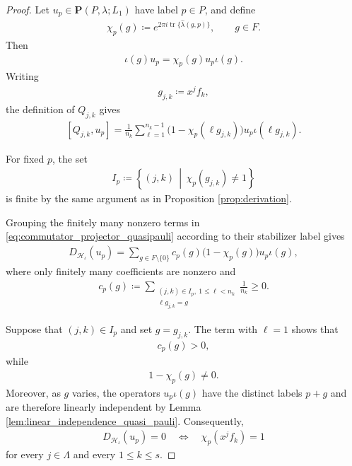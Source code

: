 \documentclass[sn-mathphys-num]{sn-jnl}
\theoremstyle{definition}
\numberwithin{equation}{section}
\theoremstyle{definition}
\def\CH {{\mathcal H}}
\def\La{{\Lambda}}
\def\l{{\lambda}}
\def\hl{{\hat \lambda}}
\def\tr{\operatorname{tr}}
\begin{document}
\begin{proof}
Let $u_p\in\textbf{P}(P,\l;L_1)$ have label $p\in P$, and define
\begin{align}
    \chi_p(g)
    \coloneqq
    e^{2\pi i\tr\{\hl(g,p)\}},
    \qquad g\in F.
\end{align}
Then
\begin{align}
    \iota(g)u_p=\chi_p(g)u_p\iota(g).
\end{align}
Writing
\begin{align}
    g_{j,k}\coloneqq x^jf_k,
\end{align}
the definition of $Q_{j,k}$ gives
\begin{align}\label{eq:commutator_projector_quasipauli}
    [Q_{j,k},u_p]
    =
    \frac{1}{n_k}
    \sum_{\ell=1}^{n_k-1}
    \bigl(1-\chi_p(\ell g_{j,k})\bigr)
    u_p\iota(\ell g_{j,k}).
\end{align}

For fixed $p$, the set
\begin{align}
    I_p
    \coloneqq
    \left\{
        (j,k)
        \,\middle|\,
        \chi_p(g_{j,k})\neq1
    \right\}
\end{align}
is finite by the same argument as in Proposition \ref{prop:derivation}.

Grouping the finitely many nonzero terms in
\eqref{eq:commutator_projector_quasipauli} according to their stabilizer
label gives
\begin{align}\label{eq:derivation_grouped_by_stabilizer_label}
    D_{\CH_{\iota}}(u_p)
    =
    \sum_{g\in F\setminus\{0\}}
    c_p(g)
    \bigl(1-\chi_p(g)\bigr)
    u_p\iota(g),
\end{align}
where only finitely many coefficients are nonzero and
\begin{align}
    c_p(g)
    \coloneqq
    \sum_{\substack{
        (j,k)\in I_p,\ 1\leqslant\ell<n_k\\
        \ell g_{j,k}=g
    }}
    \frac{1}{n_k}
    \geqslant0.
\end{align}

Suppose that $(j,k)\in I_p$ and set $g=g_{j,k}$. The term with
$\ell=1$ shows that
\begin{align}
    c_p(g)>0,
\end{align}
while
\begin{align}
    1-\chi_p(g)\neq0.
\end{align}
Moreover, as $g$ varies, the operators $u_p\iota(g)$ have the distinct
labels $p+g$ and are therefore linearly independent by Lemma \ref{lem:linear_independence_quasi_pauli}. Consequently,
\begin{align}
    D_{\CH_{\iota}}(u_p)=0
    \quad\Longleftrightarrow\quad
    \chi_p(x^jf_k)=1
\end{align}
for every $j\in\La$ and every $1\leqslant k\leqslant s$.


\end{proof}
\end{document}
